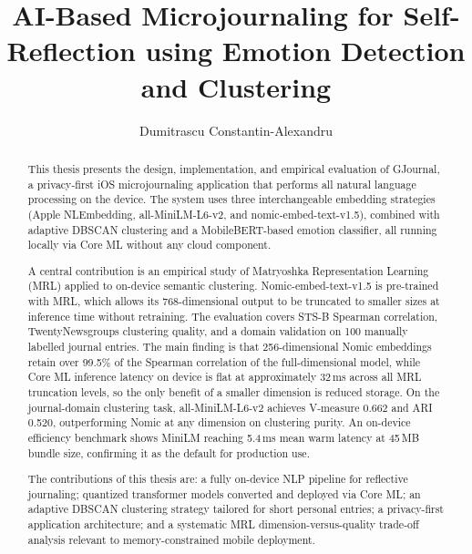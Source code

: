 \documentclass[12pt]{report}
\title{AI-Based Microjournaling for Self-Reflection using Emotion Detection and Clustering}
\author{Dumitrascu Constantin-Alexandru}
\begin{document}
\maketitle
\maketitleRO

\newpage
\thispagestyle{empty}
\mbox{}
\newpage


\cleardoublepage


\begin{abstract}
This thesis presents the design, implementation, and empirical evaluation of GJournal, a privacy-first iOS microjournaling application that performs all natural language processing on the device. The system uses three interchangeable embedding strategies (Apple NLEmbedding, all-MiniLM-L6-v2, and nomic-embed-text-v1.5), combined with adaptive DBSCAN clustering and a MobileBERT-based emotion classifier, all running locally via Core ML without any cloud component.

A central contribution is an empirical study of Matryoshka Representation Learning (MRL) applied to on-device semantic clustering. Nomic-embed-text-v1.5 is pre-trained with MRL, which allows its 768-dimensional output to be truncated to smaller sizes at inference time without retraining. The evaluation covers STS-B Spearman correlation, TwentyNewsgroups clustering quality, and a domain validation on 100 manually labelled journal entries. The main finding is that 256-dimensional Nomic embeddings retain over 99.5\% of the Spearman correlation of the full-dimensional model, while Core ML inference latency on device is flat at approximately 32\,ms across all MRL truncation levels, so the only benefit of a smaller dimension is reduced storage. On the journal-domain clustering task, all-MiniLM-L6-v2 achieves V-measure 0.662 and ARI 0.520, outperforming Nomic at any dimension on clustering purity. An on-device efficiency benchmark shows MiniLM reaching 5.4\,ms mean warm latency at 45\,MB bundle size, confirming it as the default for production use.

The contributions of this thesis are: a fully on-device NLP pipeline for reflective journaling; quantized transformer models converted and deployed via Core ML; an adaptive DBSCAN clustering strategy tailored for short personal entries; a privacy-first application architecture; and a systematic MRL dimension-versus-quality trade-off analysis relevant to memory-constrained mobile deployment.
\end{abstract}

\cleardoublepage
\tableofcontents
\cleardoublepage









\nocite{*}

\end{document}
